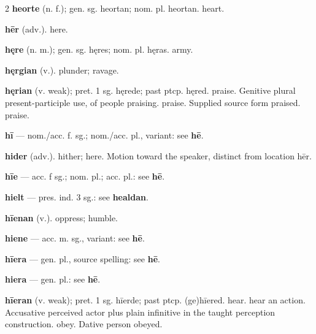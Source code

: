 \begin{multicols*}{2}
\textbf{heorte} (n. f.); gen. sg. heortan; nom. pl. heortan. heart.\par
\textbf{hēr} (adv.). here.\par
\textbf{hęre} (n. m.); gen. sg. hęres; nom. pl. hęras. army.\par
\textbf{hęrgian} (v.). plunder; ravage.\par
\textbf{hęrian} (v. weak); pret. 1 sg. hęrede; past ptcp. hęred. praise. Genitive plural present-participle use, of people praising. praise. Supplied source form praised. praise.\par
\textbf{hī} — nom./acc. f. sg.; nom./acc. pl., variant: see \textbf{hē}.\par
\textbf{hider} (adv.). hither; here. Motion toward the speaker, distinct from location hēr.\par
\textbf{hīe} — acc. f sg.; nom. pl.; acc. pl.: see \textbf{hē}.\par
\textbf{hielt} — pres. ind. 3 sg.: see \textbf{healdan}.\par
\textbf{hīenan} (v.). oppress; humble.\par
\textbf{hiene} — acc. m. sg., variant: see \textbf{hē}.\par
\textbf{hīera} — gen. pl., source spelling: see \textbf{hē}.\par
\textbf{hiera} — gen. pl.: see \textbf{hē}.\par
\textbf{hīeran} (v. weak); pret. 1 sg. hīerde; past ptcp. (ge)hīered. hear. hear an action. Accusative perceived actor plus plain infinitive in the taught perception construction. obey. Dative person obeyed.\par

\end{multicols*}
